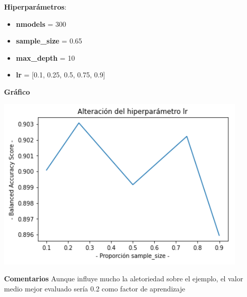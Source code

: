 \documentclass[conference,a4paper]{IEEEtran}
\begin{document}
\begin{textb}
    \textbf{Hiperparámetros}:
  \begin{itemize}
      \item \textbf{nmodels} = 300
      \item \textbf{sample\_size} = 0.65
      \item \textbf{max\_depth} = 10
      \item \textbf{lr} = [0.1, 0.25, 0.5, 0.75, 0.9]
  \end{itemize}
  \textbf{Gráfico}
  
  \begin{center}
    \includegraphics[scale=0.80]{figures/lr_adultDataset_trees.png}
    \label{fig:funcion_clasificacion}
  \end{center}
  
  \textbf{Comentarios} Aunque influye mucho la aletoriedad sobre el ejemplo, el valor medio mejor evaluado sería 0.2 como factor de aprendizaje
\end{textb}
\end{document}
